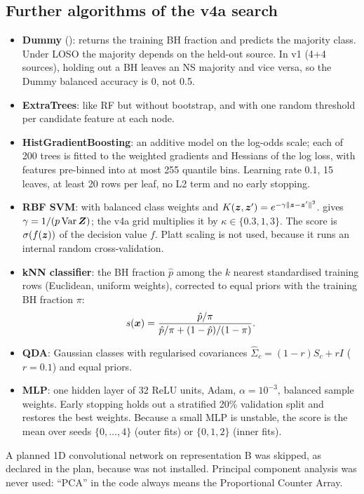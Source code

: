 \subsection{Further algorithms of the v4a search}\label{sec:otheralgs}
\begin{itemize}
\item \textbf{Dummy} (): returns the training BH fraction and predicts the majority class. Under LOSO
the majority depends on the held-out source. In v1 (4+4 sources), holding out a BH leaves an NS majority and vice versa, so
the Dummy balanced accuracy is 0, not 0.5.
\item \textbf{ExtraTrees}: like RF but without bootstrap, and with one random threshold per candidate feature at each node.
\item \textbf{HistGradientBoosting}: an additive model on the log-odds scale; each of 200 trees is fitted to the weighted
gradients and Hessians of the log loss, with features pre-binned into at most 255 quantile bins. Learning rate 0.1, 15
leaves, at least 20 rows per leaf, no L2 term and no early stopping.
\item \textbf{RBF SVM}:  with balanced class weights and $K(\bm{z},\bm{z}')=e^{-\gamma\|\bm{z}-\bm{z}'\|^2}$.
 gives $\gamma=1/(p\operatorname{Var}\bm{Z})$; the v4a grid multiplies it by $\kappa\in\{0.3,1,3\}$.
The score is $\sigma(f(\bm{z}))$ of the decision value $f$. Platt scaling is not used, because it runs an internal random
cross-validation.
\item \textbf{kNN classifier}: the BH fraction $\hat p$ among the $k$ nearest standardised training rows (Euclidean,
uniform weights), corrected to equal priors with the training BH fraction $\pi$:
\begin{equation}
s(\bm{x})=\frac{\hat p/\pi}{\hat p/\pi+(1-\hat p)/(1-\pi)}.\label{eq:knnprior}
\end{equation}
\item \textbf{QDA}: Gaussian classes with regularised covariances $\hat\Sigma_c=(1-r)S_c+rI$ ($r=0.1$) and equal priors.
\item \textbf{MLP}: one hidden layer of 32 ReLU units, Adam, $\alpha=10^{-3}$, balanced sample weights. Early stopping
holds out a stratified 20\% validation split and restores the best weights. Because a small MLP is unstable, the score is the
mean over seeds $\{0,\dots,4\}$ (outer fits) or $\{0,1,2\}$ (inner fits).
\end{itemize}
A planned 1D convolutional network on representation B was skipped, as declared in the plan, because  was not
installed. Principal component analysis was never used: ``PCA'' in the code always means the Proportional Counter Array.

